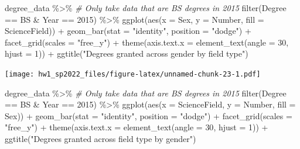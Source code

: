 \documentclass[
]{article}
\newenvironment{Shaded}{\begin{snugshade}}{\end{snugshade}}
\newcommand{\AttributeTok}[1]{\textcolor[rgb]{0.77,0.63,0.00}{#1}}
\newcommand{\CommentTok}[1]{\textcolor[rgb]{0.56,0.35,0.01}{\textit{#1}}}
\newcommand{\DecValTok}[1]{\textcolor[rgb]{0.00,0.00,0.81}{#1}}
\newcommand{\FunctionTok}[1]{\textcolor[rgb]{0.00,0.00,0.00}{#1}}
\newcommand{\NormalTok}[1]{#1}
\newcommand{\SpecialCharTok}[1]{\textcolor[rgb]{0.00,0.00,0.00}{#1}}
\newcommand{\StringTok}[1]{\textcolor[rgb]{0.31,0.60,0.02}{#1}}
\begin{document}
\begin{Shaded}
\begin{Highlighting}[]
\NormalTok{degree\_data }\SpecialCharTok{\%\textgreater{}\%}
  \CommentTok{\# Only take data that are BS degrees in 2015}
  \FunctionTok{filter}\NormalTok{(Degree }\SpecialCharTok{==} \StringTok{\textquotesingle{}BS\textquotesingle{}} \SpecialCharTok{\&}\NormalTok{ Year }\SpecialCharTok{==} \DecValTok{2015}\NormalTok{) }\SpecialCharTok{\%\textgreater{}\%}
  \FunctionTok{ggplot}\NormalTok{(}\FunctionTok{aes}\NormalTok{(}\AttributeTok{x =}\NormalTok{ Sex, }\AttributeTok{y =}\NormalTok{ Number, }\AttributeTok{fill =}\NormalTok{ ScienceField)) }\SpecialCharTok{+}
  \FunctionTok{geom\_bar}\NormalTok{(}\AttributeTok{stat =} \StringTok{"identity"}\NormalTok{, }\AttributeTok{position =} \StringTok{"dodge"}\NormalTok{) }\SpecialCharTok{+}
  \FunctionTok{facet\_grid}\NormalTok{(}\AttributeTok{scales =} \StringTok{"free\_y"}\NormalTok{) }\SpecialCharTok{+}
  \FunctionTok{theme}\NormalTok{(}\AttributeTok{axis.text.x =} \FunctionTok{element\_text}\NormalTok{(}\AttributeTok{angle =} \DecValTok{30}\NormalTok{, }\AttributeTok{hjust =} \DecValTok{1}\NormalTok{)) }\SpecialCharTok{+}
  \FunctionTok{ggtitle}\NormalTok{(}\StringTok{"Degrees granted across gender by field type"}\NormalTok{)}
\end{Highlighting}
\end{Shaded}

\texttt{[image: hw1\_sp2022\_files/figure-latex/unnamed-chunk-23-1.pdf]}

\begin{Shaded}
\begin{Highlighting}[]
\NormalTok{degree\_data }\SpecialCharTok{\%\textgreater{}\%}
  \CommentTok{\# Only take data that are BS degrees in 2015}
  \FunctionTok{filter}\NormalTok{(Degree }\SpecialCharTok{==} \StringTok{\textquotesingle{}BS\textquotesingle{}} \SpecialCharTok{\&}\NormalTok{ Year }\SpecialCharTok{==} \DecValTok{2015}\NormalTok{) }\SpecialCharTok{\%\textgreater{}\%}
  \FunctionTok{ggplot}\NormalTok{(}\FunctionTok{aes}\NormalTok{(}\AttributeTok{x =}\NormalTok{ ScienceField, }\AttributeTok{y =}\NormalTok{ Number, }\AttributeTok{fill =}\NormalTok{ Sex)) }\SpecialCharTok{+}
  \FunctionTok{geom\_bar}\NormalTok{(}\AttributeTok{stat =} \StringTok{"identity"}\NormalTok{, }\AttributeTok{position =} \StringTok{"dodge"}\NormalTok{) }\SpecialCharTok{+}
  \FunctionTok{facet\_grid}\NormalTok{(}\AttributeTok{scales =} \StringTok{"free\_y"}\NormalTok{) }\SpecialCharTok{+}
  \FunctionTok{theme}\NormalTok{(}\AttributeTok{axis.text.x =} \FunctionTok{element\_text}\NormalTok{(}\AttributeTok{angle =} \DecValTok{30}\NormalTok{, }\AttributeTok{hjust =} \DecValTok{1}\NormalTok{)) }\SpecialCharTok{+}
  \FunctionTok{ggtitle}\NormalTok{(}\StringTok{"Degrees granted across field type by gender"}\NormalTok{)}
\end{Highlighting}
\end{Shaded}
\end{document}
